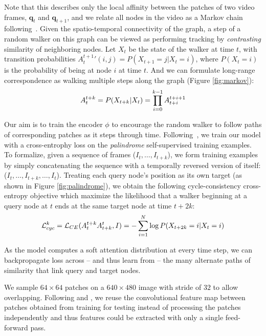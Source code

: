 Note that this describes only the local affinity between the patches of two video frames, $\mathbf{q}_{t}$ and $\mathbf{q}_{t+1}$, and we relate all nodes in the video as a Markov chain following~\cite{jabri2020walk}. Given the spatio-temporal connectivity of the graph, a step of a random walker on this graph can be viewed as performing tracking by \textit{contrasting} similarity of neighboring nodes. Let $X_{t} $ be the state of the walker at time $t$, with transition probabilities $A_t^{t+1}'(i,j) = P(X_{t+1}=j | X_{t} = i)$, where $P(X_t =i)$ is the probability of being at node $i$ at time $t$. And we can formulate long-range correspondence as walking multiple steps along the graph (Figure \ref{fig:markov}):
\vspace{-0.1in}
\begin{equation}\small
A^{t+k}_{t} = P(X_{t+k}|X_{t}) = \prod^{k-1}_{i=0}A_{t+i}^{t+i+1}
\end{equation}
\vspace{-0.1in}
 
 \par {}
 Our aim is to train the encoder $\phi$ to encourage the random walker to follow paths of corresponding patches as it steps through time. Following~\cite{jabri2020walk}, we train our model with a cross-entrophy loss on the \textit{palindrome} self-supervised training examples. To formalize, given a sequence of frames ($I_t, \dots, I_{t+k}$), we form training examples by simply concatenating the sequence with a temporally reversed version of itself: ($I_t, \dots, I_{t+k}, \dots, I_{t}$). Treating each query node's position as its own target (as shown in Figure \ref{fig:palindrome}), we obtain the following cycle-consistency cross-entropy objective which maximize the likelihood that a walker beginning at a query node at $t$ ends at the same target node at time $t + 2k$:
 \vspace{-0.1in}
\begin{equation}\small
 \mathcal{L}
^{k}_{cyc} = \mathcal{L}_{CE}(A^{t+k}_{t}A^{t}_{t+k}, I) = - \sum_{i=1}^{N} \log P(X_{t+2k}=i|X_{t} = i)
\end{equation}
 
As the model computes a soft attention distribution at every time step, we can backpropagate loss across – and thus learn from – the many alternate paths of similarity that link query and target nodes.
 
\par {}
We sample $64 \times 64$ patches on a $640\times 480$ image with stride of $32$ to allow overlapping. Following \cite{jabri2020walk} and \cite{long2015fully}, we reuse the convolutional feature map between patches obtained from training for testing instead of processing the patches independently and thus features could be extracted with only a single feed-forward pass.

